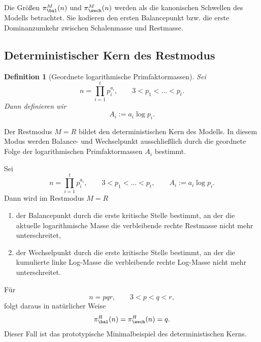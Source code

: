 \documentclass[11pt,a4paper]{article}
\newtheorem{definition}{Definition}[section]
\begin{document}
	\begin{axiom}
		\label{ax:kanonische_schwellen}
		Die Größen \(\pi_{\bal}^M(n)\) und \(\pi_{\wech}^M(n)\) werden als die kanonischen Schwellen des Modells betrachtet. Sie kodieren den ersten Balancepunkt bzw. die erste Dominanzumkehr zwischen Schalenmasse und Restmasse.
	\end{axiom}
	
	\subsection{Deterministischer Kern des Restmodus}
	
	\begin{definition}[Geordnete logarithmische Primfaktormassen]
		\label{def:modell_ai}
		Sei
		\[
		n=\prod_{i=1}^t p_i^{a_i},
		\qquad
		3<p_1<\dots<p_t.
		\]
		Dann definieren wir
		\[
		A_i:=a_i\log p_i.
		\]
	\end{definition}
	
	\begin{axiom}
		\label{ax:restmodus}
		Der Restmodus \(M=R\) bildet den deterministischen Kern des Modells. In diesem Modus werden Balance- und Wechselpunkt ausschließlich durch die geordnete Folge der logarithmischen Primfaktormassen \(A_i\) bestimmt.
	\end{axiom}
	
	\begin{satz}
		\label{satz:modell_restmodus}
		Sei
		\[
		n=\prod_{i=1}^t p_i^{a_i},
		\qquad
		3<p_1<\dots<p_t,
		\qquad
		A_i:=a_i\log p_i.
		\]
		Dann wird im Restmodus \(M=R\)
		
		\begin{enumerate}
			\item der Balancepunkt durch die erste kritische Stelle bestimmt, an der die aktuelle logarithmische Masse die verbleibende rechte Restmasse nicht mehr unterschreitet,
			\item der Wechselpunkt durch die erste kritische Stelle bestimmt, an der die kumulierte linke Log-Masse die verbleibende rechte Log-Masse nicht mehr unterschreitet.
		\end{enumerate}
	\end{satz}
	
	\begin{bemerkung}
		Für
		\[
		n=pqr,\qquad 3<p<q<r,
		\]
		folgt daraus in natürlicher Weise
		\[
		\pi_{\bal}^R(n)=\pi_{\wech}^R(n)=q.
		\]
		Dieser Fall ist das prototypische Minimalbeispiel des deterministischen Kerns.
	\end{bemerkung}
	
\end{document}

